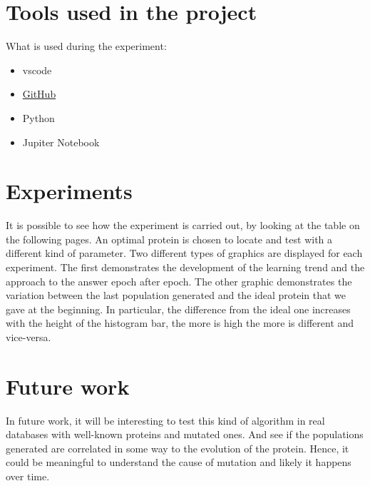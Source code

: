 \documentclass[letterpaper]{article} %
\begin{document}
\section{Tools used in the project}
What is used during the experiment:
\begin{itemize}
\item vscode
\item \href{https://github.com/Reevoc/ARTIFICIAL-INTELLIGENCE}{GitHub}
\item Python 
\item Jupiter Notebook
\end{itemize}

\section{Experiments}
It is possible to see how the experiment is carried out, by looking at the table on the following pages. An optimal protein is chosen to locate and test with a different kind of parameter. Two different types of graphics are displayed for each experiment. The first demonstrates the development of the learning trend and the approach to the answer epoch after epoch. The other graphic demonstrates the variation between the last population generated and the ideal protein that we gave at the beginning. In particular, the difference from the ideal one increases with the height of the histogram bar, the more is high the more is different and vice-versa.

\section{Future work}
In future work, it will be interesting to test this kind of algorithm in real databases with well-known proteins and mutated ones. And see if the populations generated are correlated in some way to the evolution of the protein. Hence, it could be meaningful to understand the cause of mutation and likely it happens over time.
\end{document}
